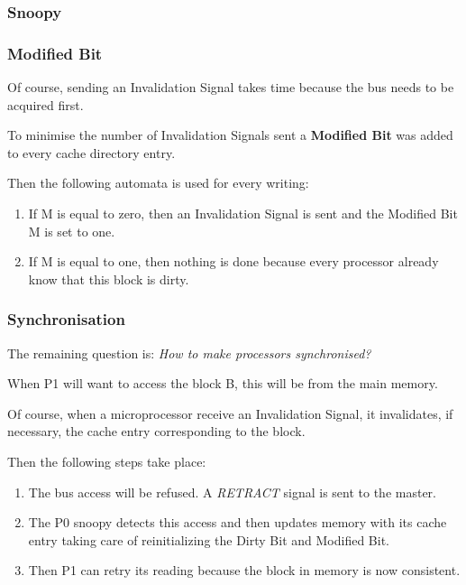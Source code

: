 
\begin{frame}
  \frametitle{Snoopy}

  \begin{center}
  \end{center}
\end{frame}


\begin{frame}
  \frametitle{Modified Bit}

  Of course, sending an Invalidation Signal takes time because the bus needs
  to be acquired first.

  \-

  To minimise the number of Invalidation Signals sent a \textbf{Modified Bit}
  was added to every cache directory entry.

  \-

  Then the following automata is used for every writing:

  \begin{enumerate}
    \item
      If M is equal to zero, then an Invalidation Signal is sent and the
      Modified Bit M is set to one.
    \item
      If M is equal to one, then nothing is done because every processor
      already know that this block is dirty.
  \end{enumerate}
\end{frame}


\begin{frame}
  \frametitle{Synchronisation}

  The remaining question is: \textit{How to make processors synchronised?}

  \-

  When P1 will want to access the block B, this will be from the main memory.

  \-

  Of course, when a microprocessor receive an Invalidation Signal, it
  invalidates, if necessary, the cache entry corresponding to the block.

  \-

  Then the following steps take place:

  \begin{enumerate}
    \item
      The bus access will be refused. A \textit{RETRACT} signal is sent
      to the master.
    \item
      The P0 snoopy detects this access and then updates memory with
      its cache entry taking care of reinitializing the Dirty Bit and Modified
      Bit.
    \item
      Then P1 can retry its reading because the block in memory is now
      consistent.
  \end{enumerate}
\end{frame}

